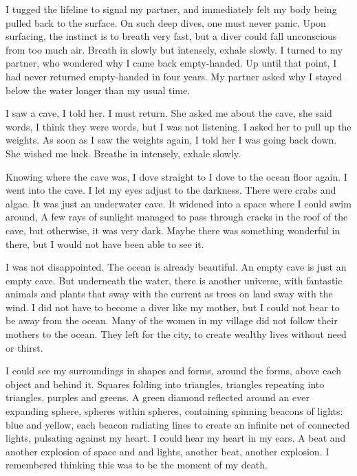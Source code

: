 \documentclass[12pt, letterpaper]{report}
\begin{document}
\vspace{1\baselineskip}
I tugged the lifeline to signal my partner, and immediately felt my body being pulled back to the surface. On such deep dives, one must never panic. Upon surfacing, the instinct is to breath very fast, but a diver could fall unconscious from too much air. Breath in slowly but intensely, exhale slowly. I turned to my partner, who wondered why I came back empty-handed. Up until that point, I had never returned empty-handed in four years. My partner asked why I stayed below the water longer than my usual time.

\vspace{1\baselineskip}
I saw a cave, I told her. I must return. She asked me about the cave, she said words, I think they were words, but I was not listening. I asked her to pull up the weights. As soon as I saw the weights again, I told her I was going back down. She wished me luck. Breathe in intensely, exhale slowly. 

\vspace{1\baselineskip}
Knowing where the cave was, I dove straight to I dove to the ocean floor again. I went into the cave. I let my eyes adjust to the darkness. There were crabs and algae. It was just an underwater cave. It widened into a space where I could swim around, A few rays of sunlight managed to pass through cracks in the roof of the cave, but otherwise, it was very dark. Maybe there was something wonderful in there, but I would not have been able to see it. 

\vspace{1\baselineskip}
I was not disappointed. The ocean is already beautiful. An empty cave is just an empty cave. But underneath the water, there is another universe, with fantastic animals and plants that sway with the current as trees on land sway with the wind. I did not have to become a diver like my mother, but I could not bear to be away from the ocean. Many of the women in my village did not follow their mothers to the ocean. They left for the city, to create wealthy lives without need or thirst.

\vspace{1\baselineskip}
I could see my surroundings in shapes and forms, around the forms, above each object and behind it. Squares folding into triangles, triangles repeating into triangles, purples and greens. A green diamond reflected around an ever expanding sphere, spheres within spheres, containing spinning beacons of lights: blue and yellow, each beacon radiating lines to create an infinite net of connected lights, pulsating against my heart. I could hear my heart in my ears. A beat and another explosion of space and and lights, another beat, another explosion. I remembered thinking this was to be the moment of my death.
\end{document}
